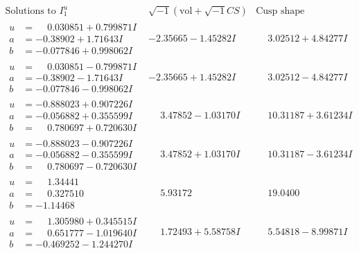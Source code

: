 \documentclass[1p]{elsarticle_modified}
\theoremstyle{definition}
\newcommand{\I}{\sqrt{-1}}
\begin{document}
$$\begin{array}{c|c|c}  
\text{Solutions to }I^u_{1}& \I (\text{vol} + \sqrt{-1}CS) & \text{Cusp shape}\\
 \hline 
\begin{aligned}
u &= \phantom{-}0.030851 + 0.799871 I \\
a &= -0.38902 + 1.71643 I \\
b &= -0.077846 + 0.998062 I\end{aligned}
 & -2.35665 - 1.45282 I & \phantom{-}3.02512 + 4.84277 I \\ \hline\begin{aligned}
u &= \phantom{-}0.030851 - 0.799871 I \\
a &= -0.38902 - 1.71643 I \\
b &= -0.077846 - 0.998062 I\end{aligned}
 & -2.35665 + 1.45282 I & \phantom{-}3.02512 - 4.84277 I \\ \hline\begin{aligned}
u &= -0.888023 + 0.907226 I \\
a &= -0.056882 + 0.355599 I \\
b &= \phantom{-}0.780697 + 0.720630 I\end{aligned}
 & \phantom{-}3.47852 - 1.03170 I & \phantom{-}10.31187 + 3.61234 I \\ \hline\begin{aligned}
u &= -0.888023 - 0.907226 I \\
a &= -0.056882 - 0.355599 I \\
b &= \phantom{-}0.780697 - 0.720630 I\end{aligned}
 & \phantom{-}3.47852 + 1.03170 I & \phantom{-}10.31187 - 3.61234 I \\ \hline\begin{aligned}
u &= \phantom{-}1.34441\phantom{ +0.000000I} \\
a &= \phantom{-}0.327510\phantom{ +0.000000I} \\
b &= -1.14468\phantom{ +0.000000I}\end{aligned}
 & \phantom{-}5.93172\phantom{ +0.000000I} & \phantom{-}19.0400\phantom{ +0.000000I} \\ \hline\begin{aligned}
u &= \phantom{-}1.305980 + 0.345515 I \\
a &= \phantom{-}0.651777 - 1.019640 I \\
b &= -0.469252 - 1.244270 I\end{aligned}
 & \phantom{-}1.72493 + 5.58758 I & \phantom{-}5.54818 - 8.99871 I \\ \hline\begin{aligned}

\end{aligned}
\end{array}$$
\end{document}
